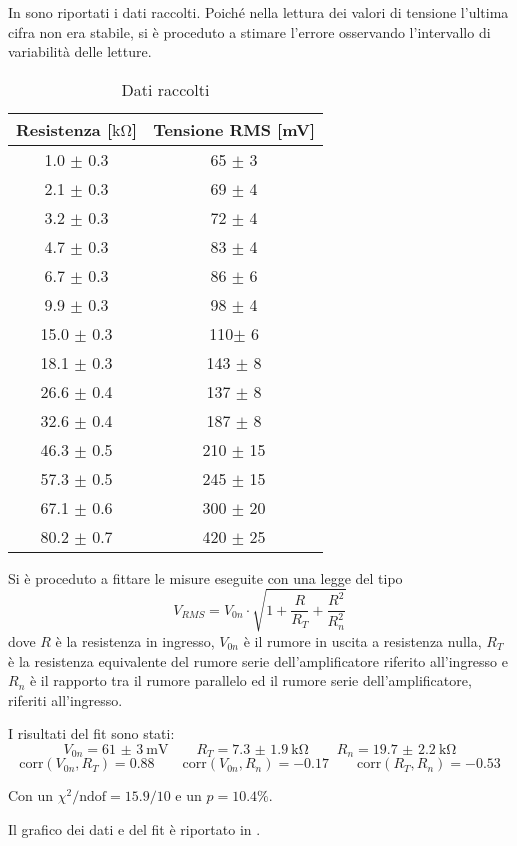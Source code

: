 In  sono riportati i dati raccolti. Poiché nella lettura dei valori di tensione l'ultima cifra non era stabile, si è proceduto a stimare l'errore osservando l'intervallo di variabilità delle letture.

\begin{table}[H]
	\centering
\begin{tabular}{c c}
	\toprule
	Resistenza [$\si{\kilo\ohm}$] & Tensione RMS [\si{\milli\volt}]\\
	\midrule
	1.0 $\pm$ 0.3 & 65 $\pm$ 3\\
	2.1 $\pm$ 0.3 & 69 $\pm$ 4\\
	3.2 $\pm$ 0.3 & 72 $\pm$ 4\\
	4.7 $\pm$ 0.3 & 83 $\pm$ 4\\
	6.7 $\pm$ 0.3 & 86 $\pm$ 6\\
	9.9 $\pm$ 0.3 & 98 $\pm$ 4\\
	15.0 $\pm$ 0.3 & 110$\pm$ 6\\
	18.1 $\pm$ 0.3 & 143 $\pm$ 8\\
	26.6 $\pm$ 0.4 & 137 $\pm$ 8\\
	32.6 $\pm$ 0.4 & 187 $\pm$ 8\\
	46.3 $\pm$ 0.5 & 210 $\pm$ 15\\
	57.3 $\pm$ 0.5 & 245 $\pm$ 15\\
	67.1 $\pm$ 0.6 & 300 $\pm$ 20\\
	80.2 $\pm$ 0.7 & 420 $\pm$ 25\\
	\bottomrule
\end{tabular}
\caption{Dati raccolti}
\label{tab:data}
\end{table}

Si è proceduto a fittare le misure eseguite con una legge del tipo 
$$V_{RMS} = V_{0n} \cdot \sqrt{1+\frac{R}{R_T} + \frac{R^2}{R_n^2}}$$
dove $R$ è la resistenza in ingresso, $V_{0n}$ è il rumore in uscita a resistenza nulla, $R_T$ è la resistenza equivalente del rumore serie dell’amplificatore riferito all’ingresso e $R_n$ è il rapporto tra il rumore parallelo ed il rumore serie dell’amplificatore,
riferiti all’ingresso.

I risultati del fit sono stati:
$$V_{0n} = \SI{61(3)}{\milli\volt} \qquad R_T = \SI{7.3(19)}{\kilo\ohm} \qquad R_n = \SI{19.7(22)}{\kilo\ohm}$$
$$ \text{corr}(V_{0n},R_T)=0.88 \qquad \text{corr}(V_{0n},R_n)=-0.17 \qquad \text{corr}(R_T,R_n)=-0.53$$

Con un $\chi^2 / \text{ndof} = 15.9 / 10$ e un $p = 10.4 \%$.

Il grafico dei dati e del fit è riportato in .

